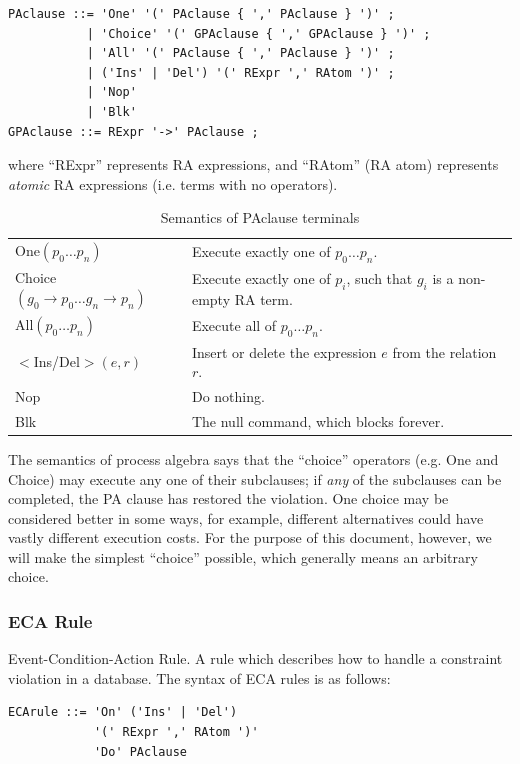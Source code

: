 \documentclass[12pt]{report}
\begin{document}
\begin{lstlisting}[basicstyle=\ttfamily]
PAclause ::= 'One' '(' PAclause { ',' PAclause } ')' ; 
           | 'Choice' '(' GPAclause { ',' GPAclause } ')' ;  
           | 'All' '(' PAclause { ',' PAclause } ')' ;  
           | ('Ins' | 'Del') '(' RExpr ',' RAtom ')' ; 
           | 'Nop'  
           | 'Blk' 
GPAclause ::= RExpr '->' PAclause ; 
\end{lstlisting}
where ``RExpr'' represents RA expressions, and ``RAtom'' (RA atom) represents
\emph{atomic} RA expressions (i.e. terms with no operators).

\begin{table}[ht!]\begin{center}\label{tab:PASemantics}
\caption{Semantics of PAclause terminals}
\begin{tabularx}{\textwidth}{lX}
One$(p_0 \ldots p_n)$ & Execute exactly one of $p_0 \ldots p_n$. \\
Choice$(g_0 \rightarrow p_0 \ldots g_n \rightarrow p_n)$ & Execute exactly
  one of $p_i$, such that $g_i$ is a non-empty RA term. \\
All$(p_0 \ldots p_n)$ & Execute all of $p_0 \ldots p_n$. \\
$<$Ins/Del$>(e,r)$ & Insert or delete the expression $e$ from the relation $r$. \\
Nop & Do nothing. \\
Blk & The null command, which blocks forever. 
\end{tabularx}
\end{center}\end{table}

The semantics of process algebra says that the ``choice'' operators (e.g. One
and Choice) may execute any one of their subclauses; if \emph{any} of the
subclauses can be completed, the PA clause has restored the violation.  One
choice may be considered better in some ways, for example, different
alternatives could have vastly different execution costs. For the purpose of
this document, however, we will make the simplest ``choice'' possible, which
generally means an arbitrary choice. 

\subsubsection*{ECA Rule}
 Event-Condition-Action Rule. A rule which describes how to handle a constraint
 violation in a database. The syntax of ECA rules is as follows:

\begin{lstlisting}[basicstyle=\ttfamily]
ECArule ::= 'On' ('Ins' | 'Del') 
            '(' RExpr ',' RAtom ')'
            'Do' PAclause    
\end{lstlisting}
\end{document}
